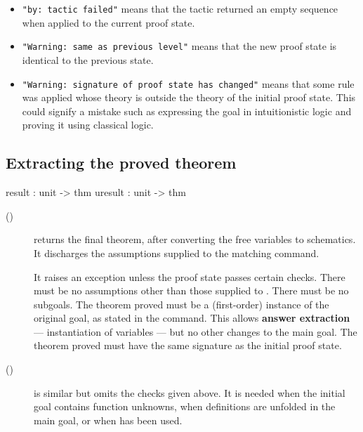 \nobreak
\begin{itemize}
\item {\footnotesize\tt "by:\ tactic failed"} means that the tactic
  returned an empty sequence when applied to the current proof state.
\item {\footnotesize\tt "Warning:\ same as previous level"} means that the
  new proof state is identical to the previous state.
\item{\footnotesize\tt "Warning:\ signature of proof state has changed"}
  means that some rule was applied whose theory is outside the theory of
  the initial proof state.  This could signify a mistake such as expressing
  the goal in intuitionistic logic and proving it using classical logic.
\end{itemize}

\subsection{Extracting the proved theorem}
\begin{ttbox} 
result  : unit -> thm
uresult : unit -> thm
\end{ttbox}
\begin{description}
\item[()] 
returns the final theorem, after converting the free variables to
schematics.  It discharges the assumptions supplied to the matching 
 command.  

It raises an exception unless the proof state passes certain checks.  There
must be no assumptions other than those supplied to .  There
must be no subgoals.  The theorem proved must be a (first-order) instance
of the original goal, as stated in the  command.  This allows
{\bf answer extraction} --- instantiation of variables --- but no other
changes to the main goal.  The theorem proved must have the same signature
as the initial proof state.

\item[()] 
is similar but omits the checks given above.  It is needed when the initial
goal contains function unknowns, when definitions are unfolded in the main
goal, or when  has been used.
\end{description}



